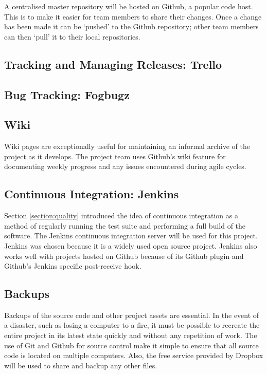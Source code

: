 \begin{fullwidth}
A centralised master repository will be hosted on Github, a popular code host. 
This is to make it easier for team members to share their changes. Once a change has been made
it can be `pushed' to the Github repository; other team members can then `pull' it to their local
repositories.

\subsection{Tracking and Managing Releases: Trello}

\subsection{Bug Tracking: Fogbugz}

\subsection{Wiki}
Wiki pages are exceptionally useful for maintaining an informal archive of the project as it develops. The project team uses Github's wiki feature for documenting weekly progress and any issues encountered during agile cycles.

\subsection{Continuous Integration: Jenkins}

Section \ref{section:quality} introduced the idea of continuous integration as a method
of regularly running the test suite and performing a full build of the software.
The Jenkins continuous integration server
will be used for this project. Jenkins was chosen because it is a widely used open
source project.
Jenkins also works well with projects hosted on Github because of its Github plugin
and Github's Jenkins specific post-receive hook.

\subsection{Backups}

Backups of the source code and other project assets are essential. In the event of a
disaster, such as losing a computer to a fire, it must be possible to recreate the
entire project in its latest state quickly and without any repetition of work.
The use of Git and Github for source control make it simple to ensure that all
source code is located on multiple computers.
Also, the free service provided by Dropbox
will be used to share and backup any other files.


\end{fullwidth}
